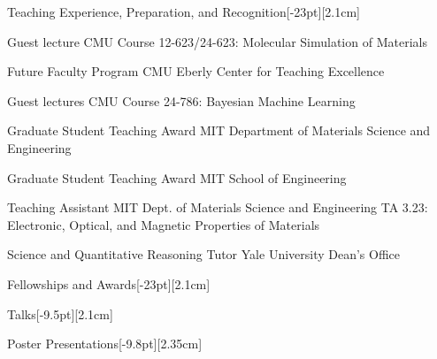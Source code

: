 \documentclass{cv} %
\begin{document}
\vspace{-2mm}
\begin{cvSection}{Teaching Experience, Preparation, and Recognition}[-23pt][2.1cm]

    {Guest lecture}
    {CMU Course 12-623/24-623: Molecular Simulation of Materials}
    {}

    \cvItem{}
    {Future Faculty Program}
    {CMU Eberly Center for Teaching Excellence}
    {}

    \cvItem{}
    {Guest lectures}
    {CMU Course 24-786: Bayesian Machine Learning}
    {}
  
    {Graduate Student Teaching Award}
    {MIT Department of Materials Science and Engineering}
    {}

    \cvItem{}
    {Graduate Student Teaching Award}
    {MIT School of Engineering}
    {}
  
    {Teaching Assistant}
    {MIT Dept. of Materials Science and Engineering}
    {\vspace{14pt}TA 3.23: Electronic, Optical, and Magnetic Properties of Materials}

    {Science and Quantitative Reasoning Tutor}
    {Yale University Dean's Office}
    {}

\end{cvSection}

\begin{cvSection}{Fellowships and Awards}[-23pt][2.1cm]
    
\end{cvSection}

\begin{pubsSection}[-8pt][2.1cm]
    
\end{pubsSection}

\vspace{-2mm}
\begin{cvSection}{Talks}[-9.5pt][2.1cm]
    
\end{cvSection}

\begin{cvSection}{Poster Presentations}[-9.8pt][2.35cm]
    
\end{cvSection}
\end{document}

